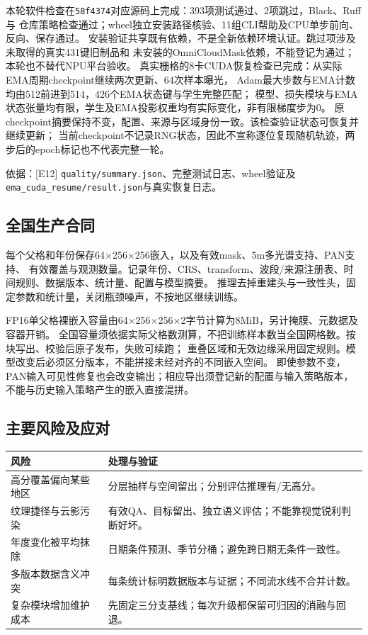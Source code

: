 \documentclass[UTF8,fontset=fandol,zihao=5,a4paper]{ctexart}
\newcommand{\source}[1]{\par{\footnotesize\color{muted}依据：#1}\par}
\begin{document}
本轮软件检查在\texttt{58f4374}对应源码上完成：393项测试通过、2项跳过，Black、Ruff与
仓库策略检查通过；wheel独立安装路径核验、11组CLI帮助及CPU单步前向、反向、保存通过。
安装验证共享既有依赖，不是全新依赖环境认证。跳过项涉及未取得的真实431键旧制品和
未安装的OmniCloudMask依赖，不能登记为通过；本轮也不替代NPU平台验收。
真实栅格的8卡CUDA恢复检查已完成：从实际EMA周期checkpoint继续两次更新、64次样本曝光，
Adam最大步数与EMA计数均由512前进到514，426个EMA状态键与学生完整匹配；
模型、损失模块与EMA状态张量均有限，学生及EMA投影权重均有实际变化，非有限梯度步为0。
原checkpoint摘要保持不变，配置、来源与区域身份一致。该检查验证状态可恢复并继续更新；
当前checkpoint不记录RNG状态，因此不宣称逐位复现随机轨迹，两步后的epoch标记也不代表完整一轮。
\source{[E12] \texttt{quality/summary.json}、完整测试日志、wheel验证及
\texttt{ema\_cuda\_resume/result.json}与真实恢复日志。}

\subsection{全国生产合同}
每个父格和年份保存64$\times$256$\times$256嵌入，以及有效mask、5m多光谱支持、PAN支持、
有效覆盖与观测数量。记录年份、CRS、transform、波段/来源注册表、时间规则、数据版本、统计量、配置与模型摘要。
推理去掉重建头与一致性头，固定参数和统计量，关闭瓶颈噪声，不按地区继续训练。

FP16单父格裸嵌入容量由64$\times$256$\times$256$\times$2字节计算为8MiB，另计掩膜、元数据及容器开销。
全国容量须依据实际父格数测算，不把训练样本数当全国网格数。按块写出、校验后原子发布，失败可续跑；
重叠区域和无效边缘采用固定规则。模型改变后必须区分版本，不能拼接未经对齐的不同嵌入空间。
即使参数不变，PAN输入可见性修复也会改变输出；相应导出须登记新的配置与输入策略版本，
不能与历史输入策略产生的嵌入直接混拼。

\subsection{主要风险及应对}
\noindent\begin{tabularx}{\linewidth}{@{}p{3cm}Y@{}}
\toprule 风险 & 处理与验证\\\midrule
高分覆盖偏向某些地区 & 分层抽样与空间留出；分别评估推理有/无高分。\\
纹理捷径与云影污染 & 有效QA、目标留出、独立语义评估；不能靠视觉锐利判断好坏。\\
年度变化被平均抹除 & 日期条件预测、季节分桶；避免跨日期无条件一致性。\\
多版本数据含义冲突 & 每条统计标明数据版本与证据；不同流水线不合并计数。\\
复杂模块增加维护成本 & 先固定三分支基线；每次升级都保留可归因的消融与回退。\\\bottomrule
\end{tabularx}
\end{document}
